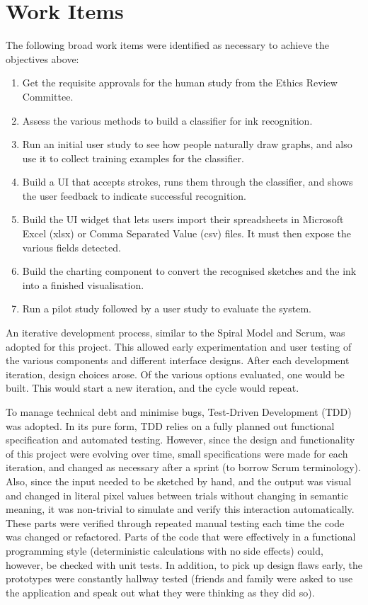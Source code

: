 	\section{Work Items}

	The following broad work items were identified as necessary to achieve the objectives above:
	\begin{enumerate}
		\item Get the requisite approvals for the human study from the Ethics Review Committee.
		\item Assess the various methods to build a classifier for ink recognition.
		\item Run an initial user study to  see how people naturally draw graphs, and also use it to collect training examples for the classifier.
		\item Build a UI that accepts strokes, runs them through the classifier, and shows the user feedback to indicate successful recognition.
		\item Build the UI widget that lets users import their spreadsheets in Microsoft Excel (xlsx) or Comma Separated Value (csv) files. It must then expose the various fields detected.
		\item Build the charting component to convert the recognised sketches and the ink into a finished visualisation.
		\item Run a pilot study followed by a user study to evaluate the system.
	\end{enumerate}	
	
	An iterative development process, similar to the Spiral Model and Scrum, was adopted for this project. This allowed early experimentation and user testing of the various components and different interface designs. After each development iteration, design choices arose. Of the various options evaluated, one would be built. This would start a new iteration, and the cycle would repeat.
	
	To manage technical debt and minimise bugs, Test-Driven Development (TDD) was adopted. In its pure form, TDD relies on a fully planned out functional specification and automated testing. However, since the design and functionality of this project were evolving over time, small specifications were made for each iteration, and changed as necessary after a sprint (to borrow Scrum terminology). Also, since the input needed to be sketched by hand, and the output was visual and changed in literal pixel values between trials without changing in semantic meaning, it was non-trivial to simulate and verify this interaction automatically. These parts were verified through repeated manual testing each time the code was changed or refactored. Parts of the code that were effectively in a functional programming style (deterministic calculations with no side effects) could, however, be checked with unit tests. In addition, to pick up design flaws early, the prototypes were constantly hallway tested (friends and family were asked to use the application and speak out what they were thinking as they did so).
	
